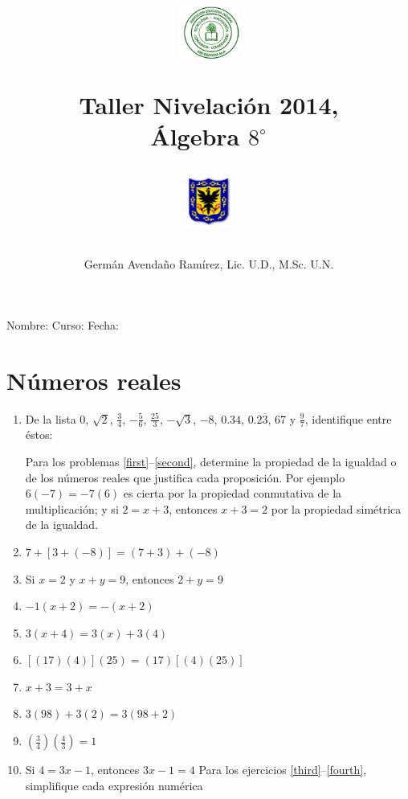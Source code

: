 \documentclass[10pt,twoside]{article}
\author{Germ\'an Avenda\~no Ram\'irez, Lic. U.D., M.Sc. U.N.}
\title{\begin{minipage}{.2\textwidth}
\includegraphics[height=1.75cm]{Images/logo-colegio.png}\end{minipage}
\begin{minipage}{.55\textwidth}
\begin{center}
Taller Nivelación 2014,  \\
Álgebra $8^{\circ}$
\end{center}
\end{minipage}\hfill
\begin{minipage}{.2\textwidth}
\includegraphics[height=1.75cm]{Images/logo-sed.png} 
\end{minipage}}
\date{}
\begin{document}
\maketitle
Nombre: \hrulefill Curso: \underline{\hspace*{44pt}} Fecha: \underline{\hspace*{2.5cm}}
\section*{N\'{u}meros reales}
\begin{enumerate}
\item De la lista 0, $\sqrt{2}$, $\frac{3}{4}$, $-\frac{5}{6}$, $\frac{25}{3}$, $-\sqrt{3}$, $-8$, $0.34$, $0.2\overline{3}$, 67 y $\frac{9}{7}$, identifique entre \'{e}stos:
\begin{enumerate}
\end{enumerate}
Para los problemas \ref{first}--\ref{second}, determine la propiedad de la igualdad o de los números reales que justifica cada proposición. Por ejemplo $6(-7)=-7(6)$ es cierta por la propiedad conmutativa de la multiplicación; y si $2=x+3$, entonces $x+3=2$ por la propiedad simétrica de la igualdad.
\item $7+[3+(-8)]=(7+3)+(-8)$\label{first}
\item Si $x=2$ y $x+y=9$, entonces $2+y=9$
\item $-1(x+2)=-(x+2)$
\item $3(x+4)=3(x)+3(4)$
\item $[(17)(4)](25)=(17)[(4)(25)]$
\item $x+3=3+x$
\item $3(98)+3(2)=3(98+2)$
\item $\left(\frac{3}{4}\right)\left(\frac{4}{3}\right)=1$
\item Si $4=3x-1$, entonces $3x-1=4$\label{second}
Para los ejercicios \ref{third}--\ref{fourth}, simplifique cada expresión numérica
\end{enumerate}
\end{document}

